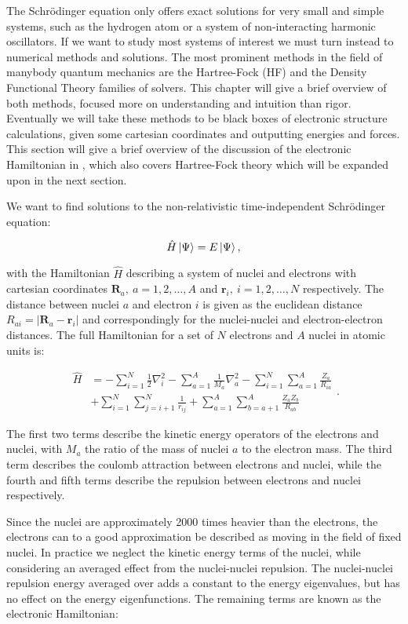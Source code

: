 The Schr\"{o}dinger equation only offers exact solutions
for very small and simple systems, such as the hydrogen atom
or a system of non-interacting harmonic oscillators.
If we want to study most systems of interest we must turn
instead to numerical methods and solutions.
The most prominent methods in the field of manybody
quantum mechanics are the Hartree-Fock (HF) and the
Density Functional Theory families of solvers.
This chapter will give a brief overview of both methods,
focused more on understanding and intuition than rigor.
Eventually we will take these methods to be black boxes of
electronic structure calculations, given some cartesian
coordinates and outputting energies and forces.
This section will give a brief overview of the discussion
of the electronic Hamiltonian in \parencite[Szabo][pages 39-89]
{szabo1996modern}, which also covers Hartree-Fock theory
which will be expanded upon in the next section.
\par
We want to find solutions to the non-relativistic time-independent
Schr\"{o}dinger equation:

\begin{equation}
 \hat{H} \ket{\Psi} = E \ket{\Psi} ,
\end{equation}

with the Hamiltonian $\hat{H}$ describing a system of nuclei and electrons
with cartesian coordinates $\bm{R}_a, \ a=1,2,\dots,A$ and $\bm{r}_i, \
i=1,2,\dots,N$ respectively. The distance between nuclei $a$
and electron $i$ is given as the euclidean distance
$R_{ai} = \left| \bm{R}_a - \bm{r}_i \right|$
and correspondingly for the nuclei-nuclei and electron-electron distances.
The full Hamiltonian for a set of $N$ electrons and $A$ nuclei
in atomic units is:

\begin{equation}
    \begin{split}
        \hat{H}
        &= -\sum_{i=1}^N \frac{1}{2} \nabla_i^2
        -\sum_{a=1}^A \frac{1}{M_a} \nabla_a^2
        -\sum_{i=1}^N \sum_{a=1}^A \frac{Z_a}{R_{ia}} \\
        &+ \sum_{i=1}^N \sum_{j=i+1}^N \frac{1}{r_{ij}}
        + \sum_{a=1}^A \sum_{b=a+1}^A \frac{Z_a Z_b}{R_{ab}}
    \end{split} .
\end{equation}

The first two terms describe the kinetic energy operators
of the electrons and nuclei, with $M_a$ the ratio of the mass
of nuclei $a$ to the electron mass. The third term describes the
coulomb attraction between electrons and nuclei, while the fourth and fifth
terms describe the repulsion between electrons and nuclei respectively.
\par
Since the nuclei are approximately 2000 times heavier
than the electrons, the electrons can to a good approximation
be described as moving in the field of fixed nuclei. In practice we
neglect the kinetic energy terms of the nuclei, while considering
an averaged effect from the nuclei-nuclei repulsion.
The nuclei-nuclei repulsion energy averaged over 
adds a constant to the energy
eigenvalues, but has no effect on the energy eigenfunctions.
The remaining terms are known as the electronic Hamiltonian:


